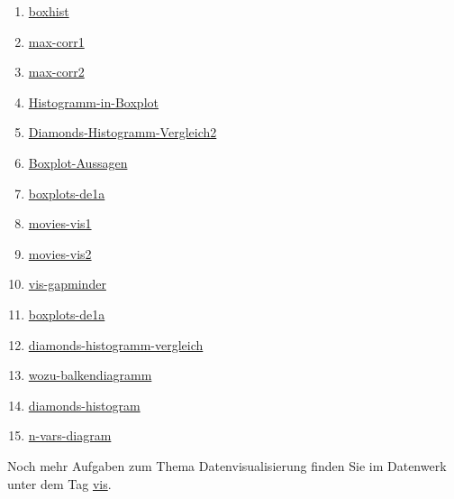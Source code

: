 \documentclass[
  letterpaper,
  oneside,
  open=any]{scrbook}
\providecommand{\tightlist}{%
  \setlength{\itemsep}{0pt}\setlength{\parskip}{0pt}}\usepackage{longtable,booktabs,array}
\theoremstyle{definition}
\theoremstyle{definition}
\theoremstyle{definition}
\theoremstyle{remark}
\begin{document}
\begin{enumerate}
\def\labelenumi{\arabic{enumi}.}
\tightlist
\item
  \href{https://sebastiansauer.github.io/Datenwerk/posts/boxhist/boxhist.html}{boxhist}
\item
  \href{https://sebastiansauer.github.io/Datenwerk/posts/max-corr1/max-corr1.html}{max-corr1}
\item
  \href{https://sebastiansauer.github.io/Datenwerk/posts/max-corr2/max-corr2.html}{max-corr2}
\item
  \href{https://sebastiansauer.github.io/Datenwerk/posts/histogramm-in-boxplot/histogramm-in-boxplot}{Histogramm-in-Boxplot}
\item
  \href{https://sebastiansauer.github.io/Datenwerk/posts/diamonds-histogramm-vergleich2/diamonds-histogramm-vergleich2}{Diamonds-Histogramm-Vergleich2}
\item
  \href{https://sebastiansauer.github.io/Datenwerk/posts/boxplot-aussagen/boxplot-aussagen}{Boxplot-Aussagen}
\item
  \href{https://sebastiansauer.github.io/Datenwerk/posts/boxplots-de1a/boxplots-de1a.html}{boxplots-de1a}
\item
  \href{https://sebastiansauer.github.io/Datenwerk/posts/movies-vis1/movies-vis1.html}{movies-vis1}
\item
  \href{https://sebastiansauer.github.io/Datenwerk/posts/movies-vis2/movies-vis2.html}{movies-vis2}
\item
  \href{https://sebastiansauer.github.io/Datenwerk/posts/vis-gapminder/vis-gapminder}{vis-gapminder}
\item
  \href{https://sebastiansauer.github.io/Datenwerk/posts/boxplots-de1a/boxplots-de1a}{boxplots-de1a}
\item
  \href{https://sebastiansauer.github.io/Datenwerk/posts/diamonds-histogramm-vergleich/diamonds-histogramm-vergleich}{diamonds-histogramm-vergleich}
\item
  \href{https://sebastiansauer.github.io/Datenwerk/posts/wozu-balkendiagramm/wozu-balkendiagramm}{wozu-balkendiagramm}
\item
  \href{https://sebastiansauer.github.io/Datenwerk/posts/diamonds-histogram/diamonds-histogram}{diamonds-histogram}
\item
  \href{https://sebastiansauer.github.io/Datenwerk/posts/n-vars-diagram/n-vars-diagram}{n-vars-diagram}
\end{enumerate}

Noch mehr Aufgaben zum Thema Datenvisualisierung finden Sie im Datenwerk
unter dem Tag
\href{https://sebastiansauer.github.io/Datenwerk/\#category=vis}{vis}.
\end{document}

